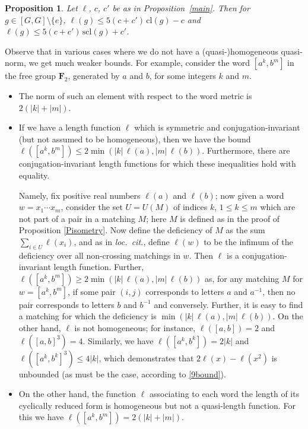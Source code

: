 \documentclass[11pt,a4paper,reqno]{amsart}
\numberwithin{equation}{section}
\theoremstyle{plain}
\newtheorem{proposition}[equation]{Proposition}
\theoremstyle{definition}
\newcommand\normsymb{\ell}  %
\newcommand\norm[1]{\ell({#1})}   %
\newcommand\free[1]{\mathbf{F}_{#1}}
\begin{document}
\begin{proposition}
Let $\normsymb$, $c$, $c'$ be as in Proposition~\ref{main}. Then for
$g\in [G, G] \setminus \{e\}$,
$\norm{g}\leq 5(c+c')\, \mathrm{cl}(g) - c$ and $\norm{g}\leq 5(c+c')\,
\mathrm{scl}(g) + c'$.
\end{proposition}


Observe that in various cases where we do not have a (quasi-)homogeneous
quasi-norm, we get much weaker bounds. For example, consider the word
$[a^k, b^m]$ in the free group $\free{2}$, generated by $a$ and $b$, for
some integers $k$ and $m$.
\begin{itemize}
\item The norm of such an element with respect  to the word metric is
$2(|k| + |m|)$.

\item If we have a length function $\normsymb$ which is symmetric and
conjugation-invariant (but not assumed to be homogeneous), then we have
the bound $\norm{[a^k, b^m]} \leq 2 \min (|k|\, \norm{a}, |m|\,
\norm{b})$.  Furthermore, there are conjugation-invariant length
functions for which these inequalities hold with equality.

Namely, fix positive real numbers $\norm{a}$ and $\norm{b}$; now given a
word $w = x_1 \cdots x_m$, consider the set $U=U(M)$ of indices $k$,
$1\leq k\leq m$ which are not part of a pair in a matching $M$; here $M$
is defined as in the proof of Proposition \ref{Pisometry}. Now define the
deficiency of $M$ as the sum $\sum_{i\in U}\norm{x_i}$, and as in
\textit{loc.~cit.}, define $\norm{w}$ to be the infimum of the deficiency
over all non-crossing matchings in $w$. Then $\normsymb$ is a
conjugation-invariant length function.
Further, $\norm{[a^k, b^m]} \geq 2 \min (|k|\, \norm{a}, |m|\, \norm{b})$
as, for any matching $M$ for $w=[a^k, b^m]$, if some pair $(i, j)$
corresponds to letters $a$ and $a^{-1}$, then no pair corresponds to
letters $b$ and $b^{-1}$ and conversely. Further, it is easy to find a
matching for which the deficiency is $\min (|k|\, \norm{a}, |m|\,
\norm{b})$.  On the other hand, $\normsymb$ is not homogeneous; for
instance, $\norm{[a,b]} = 2$ and $\norm{[a,b]^3} = 4$.  Similarly, we
have $\norm{[a^k,b^k]}=2|k|$ and $\norm{[a^k,b^k]^3} \leq 4|k|$, which
demonstrates that $2\norm{x} - \norm{x^2}$ is unbounded (as must be the
case, according to \eqref{9bound}).

\item On the other hand, the function $\normsymb$ associating to each
word the length of its cyclically reduced form is homogeneous but not a
quasi-length function. For this we have $\norm{[a^k, b^m]} = 2(|k| +
|m|)$.
\end{itemize}
\end{document}
